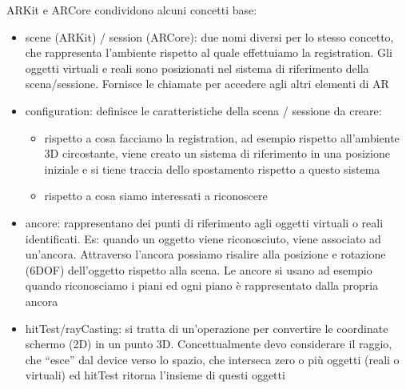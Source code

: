 ARKit e ARCore condividono alcuni concetti base:
\begin{itemize}
    \item scene (ARKit) / session (ARCore): due nomi diversi per lo stesso concetto, che rappresenta l'ambiente rispetto al quale effettuiamo la registration. Gli oggetti virtuali e reali sono posizionati nel sistema di riferimento della scena/sessione. Fornisce le chiamate per accedere agli altri elementi di AR
    \item configuration: definisce le caratteristiche della scena / sessione da creare:
    \begin{itemize}
        \item rispetto a cosa facciamo la registration, ad esempio rispetto all'ambiente 3D circostante, viene creato un sistema di riferimento in una posizione iniziale e si tiene traccia dello spostamento rispetto a questo sistema
        \item rispetto a cosa siamo interessati a riconoscere
    \end{itemize}
    \item ancore: rappresentano dei punti di riferimento agli oggetti virtuali o reali identificati. Es: quando un oggetto viene riconosciuto, viene associato ad un’ancora. Attraverso l’ancora possiamo risalire alla posizione e rotazione (6DOF) dell'oggetto rispetto alla scena. Le ancore si usano ad esempio quando riconosciamo i piani ed ogni piano è rappresentato dalla propria ancora
    \item hitTest/rayCasting: si tratta di un’operazione per convertire le coordinate schermo (2D) in un punto 3D. Concettualmente devo considerare il raggio, che “esce” dal device verso lo spazio, che interseca zero o più oggetti (reali o virtuali) ed hitTest ritorna l’insieme di questi oggetti
\end{itemize} 


